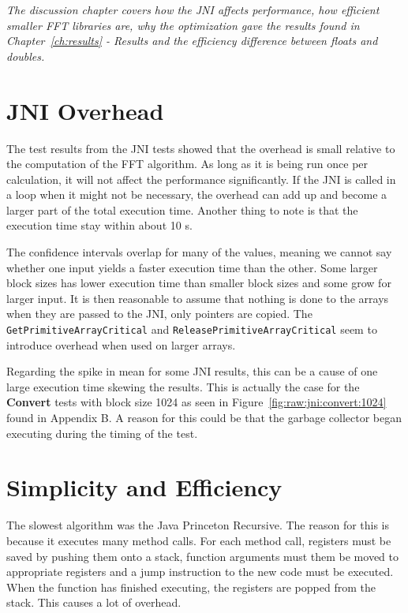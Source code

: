 \textit{The discussion chapter covers how the JNI affects performance, how efficient smaller FFT libraries are, why the optimization gave the results found in Chapter~\ref{ch:results} - Results and the efficiency difference between floats and doubles.}

\section{JNI Overhead}
The test results from the JNI tests showed that the overhead is small relative to the computation of the FFT algorithm. As long as it is being run once per calculation, it will not affect the performance significantly. If the JNI is called in a loop when it might not be necessary, the overhead can add up and become a larger part of the total execution time. Another thing to note is that the execution time stay within about 10 \textmu s.

The confidence intervals overlap for many of the values, meaning we cannot say whether one input yields a faster execution time than the other. Some larger block sizes has lower execution time than smaller block sizes and some grow for larger input. It is then reasonable to assume that nothing is done to the arrays when they are passed to the JNI, only pointers are copied. The \texttt{GetPrimitiveArrayCritical} and \texttt{ReleasePrimitiveArrayCritical} seem to introduce overhead when used on larger arrays. %

Regarding the spike in mean for some JNI results, this can be a cause of one large execution time skewing the results. This is actually the case for the \textbf{Convert} tests with block size 1024 as seen in Figure~\ref{fig:raw:jni:convert:1024} found in Appendix B. A reason for this could be that the garbage collector began executing during the timing of the test.

\section{Simplicity and Efficiency}

The slowest algorithm was the Java Princeton Recursive. The reason for this is because it executes many method calls. For each method call, registers must be saved by pushing them onto a stack, function arguments must them be moved to appropriate registers and a jump instruction to the new code must be executed. When the function has finished executing, the registers are popped from the stack. This causes a lot of overhead.

